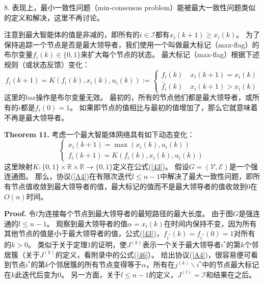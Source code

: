 \documentclass{article}
\begin{document}
 8. 表现上，最小一致性问题（min-consensus problem）能被最大一致性问题类似的定义和解决，这里不再讨论。

注意到最大智能体的值是非减的，即所有的$i\in\mathcal{I}$都有$x_i(k+1)\ge x_i(k)$。
为了保持追踪一个节点是否是最大领导者，我们使用一个叫做最大标记（max-flag）的布尔变量$f_i(k)\in\{0,1\}$来扩大每个节点的状态。
最大标记（max-flag）根据下述规则（或状态反馈）变化：
\begin{equation}
    \tag{43}
    \label{43}
    f_i(k+1) = K(f_i(k),x_i(k),u_i(k)):=
    \left\{
        \begin{matrix}
            f_i(k)\quad x_i(k+1)=x_i(k)\\
            \bar{f}_i(k) \quad x_i(k+1)>x_i(k)
        \end{matrix}
    \right.
\end{equation}
这里的bar操作是布尔变量无效。
最初的，所有的节点他们都是最大领导者，或所有的$i$都是$f_i(0)=1$。
如果即节点的值相比与最初的值增加了，那么它就意味着不再是最大领导者。

\noindent\textbf{Theorem 11.} 考虑一个最大智能体网络具有如下动态变化：
\begin{equation}
    \tag{44}
    \label{44}
    \left\{
        \begin{matrix}
            x_i(k+1) = \max(x_i(k),u_i(k))\\
            f_i(k+1) = K(f_i(k),x_i(k),u_i(k))
        \end{matrix}
    \right.
\end{equation}
这里映射$K:\{0,1\}\times \mathbb{R}\times\mathbb{R}\rightarrow\{0,1\}$定义在公式(\ref{43})。
假设$G=(\mathcal{V},\mathcal{E})$是一个强连通图。
那么，协议(\ref{A4})在有限次迭代$l\le n-1$中解决了最大一致性问题，即所有节点值收敛到最大领导者的值，最大标记的值而不是最大领导者的值收敛到0在$O(n)$时间。

\noindent\textbf{Proof.} 令$l$为连接每个节点到最大领导者的最短路径的最大长度。
由于图$G$是强连通的$l\le n-1$。
观察到最大领导者的值$\alpha=x_i(k)$在时间内保持不变，因为所有其他节点的值是小于最大领导者的值，公式(\ref{43})，$f_{i^*}(k)=f_{i^*}(0)=1$对所有的$k>0$。
类似于关于定理1的证明，使$J^{(k)}$表示一个关于最大领导者$i^*$的第$k$个邻居簇（关于$J^{(k)}$的定义，看附录中的公式(\ref{46}）。
给出协议(\ref{A4})，很容易便可看到节点$i^*$的第$k$个邻居簇的所有节点变得等于$\alpha$，所有在$j^{(k)}\backslash {i^*}$中的节点最大标记在$k$此迭代后变为0。
另一方面，关于$l\le n-1$的定义，$J^{(l)}=\mathcal{I}$和结果在之后。
\end{document}
